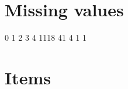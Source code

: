 \documentclass[11pt]{article}
\begin{document}
\section{Missing values}
\label{sec-2}
\begin{Schunk}
\begin{Soutput}
   0    1    2    3    4 
1118   41    4    1    1 
\end{Soutput}
\end{Schunk}

\section{Items}
\label{sec-3}
\end{document}
